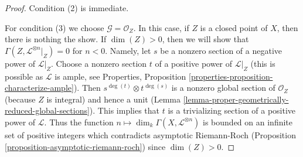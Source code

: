 \begin{proof}
\medskip\noindent
Condition (2) is immediate.

\medskip\noindent
For condition (3) we choose $\mathcal{G} = \mathcal{O}_Z$.
In this case, if $Z$ is a closed point of $X$, then there is
nothing the show. If $\dim(Z) > 0$, then we will show that
$\Gamma(Z, \mathcal{L}^{\otimes n}|_Z) = 0$
for $n < 0$. Namely, let $s$ be a nonzero section of a negative
power of $\mathcal{L}|_Z$. Choose a nonzero section $t$ of a positive
power of $\mathcal{L}|_Z$ (this is possible as $\mathcal{L}$ is ample, see
Properties, Proposition \ref{properties-proposition-characterize-ample}).
Then $s^{\deg(t)} \otimes t^{\deg(s)}$
is a nonzero global section of $\mathcal{O}_Z$
(because $Z$ is integral) and hence
a unit (Lemma \ref{lemma-proper-geometrically-reduced-global-sections}).
This implies that $t$ is a trivializing section
of a positive power of $\mathcal{L}$.
Thus the function $n \mapsto \dim_k \Gamma(X, \mathcal{L}^{\otimes n})$
is bounded on an infinite set of positive integers which contradicts
asymptotic Riemann-Roch
(Proposition \ref{proposition-asymptotic-riemann-roch})
since $\dim(Z) > 0$.
\end{proof}